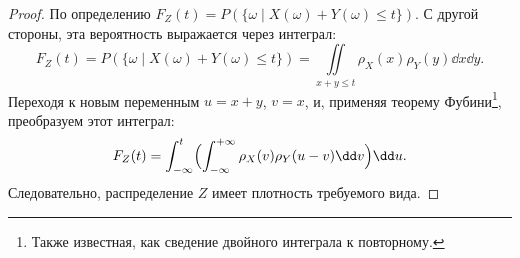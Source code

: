 \begin{proof}
    По определению $F_{Z}(t) = P(\{\omega \mid X(\omega) + Y(\omega) \leqslant t\})$.
    С другой стороны, эта вероятность выражается через интеграл:
    \[
        F_{Z}(t) = P(\{\omega \mid X(\omega) + Y(\omega) \leqslant t\}) = \iint\limits_{x + y \leqslant t} \rho_{X}(x) \rho_{Y}(y) \dd x \dd y.
    \]
    Переходя к новым переменным $u = x + y$, $v = x$, и, применяя теорему Фубини\footnote{Также известная, как сведение двойного интеграла к повторному.}, преобразуем этот интеграл:
    \[
        F_{Z}(t) = \int_{-\infty}^t \Bigl(\int_{-\infty}^{+\infty} \rho_{X}(v) \rho_{Y}(u - v) \dd v \Bigr) \dd u.
    \]
    Следовательно, распределение $Z$ имеет плотность требуемого вида.
\end{proof}